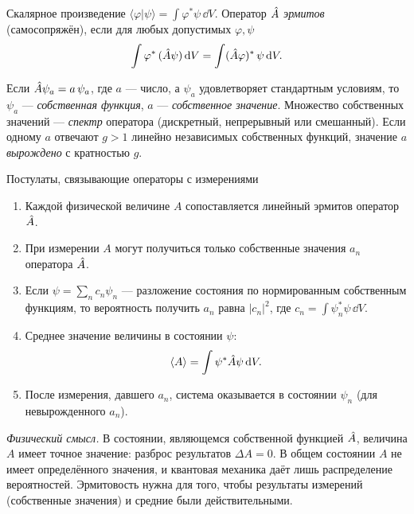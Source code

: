 \begin{definition}
Скалярное произведение $\langle\varphi|\psi\rangle=\int\varphi^*\psi\,\dd V$. Оператор $\hat{A}$
\emph{эрмитов} (самосопряжён), если для любых допустимых $\varphi,\psi$
\begin{equation}\label{eq:5:herm}
  \int\varphi^*\,(\hat{A}\psi)\,\mathrm{d} V=\int(\hat{A}\varphi)^*\,\psi\,\mathrm{d} V .
\end{equation}
\end{definition}

\begin{definition}
Если $\hat{A}\psi_a=a\,\psi_a$, где $a$ — число, а $\psi_a$ удовлетворяет стандартным условиям,
то $\psi_a$ — \emph{собственная функция}, $a$ — \emph{собственное значение}. Множество собственных
значений — \emph{спектр} оператора (дискретный, непрерывный или смешанный). Если одному $a$
отвечают $g>1$ линейно независимых собственных функций, значение $a$ \emph{вырождено} с
кратностью $g$.
\end{definition}

\begin{principle}{Постулаты, связывающие операторы с измерениями}
\begin{enumerate}[leftmargin=1.4em]
 \item Каждой физической величине $A$ сопоставляется линейный эрмитов оператор $\hat{A}$.
 \item При измерении $A$ могут получиться только собственные значения $a_n$ оператора $\hat{A}$.
 \item Если $\psi=\sum_nc_n\psi_n$ — разложение состояния по нормированным собственным функциям,
       то вероятность получить $a_n$ равна $|c_n|^2$, где $c_n=\int\psi_n^*\psi\,\dd V$.
 \item Среднее значение величины в состоянии $\psi$:
       \begin{equation}\label{eq:5:mean}
         \langle A\rangle=\int\psi^*\hat{A}\psi\,\mathrm{d} V .
       \end{equation}
 \item После измерения, давшего $a_n$, система оказывается в состоянии $\psi_n$ (для невырожденного $a_n$).
\end{enumerate}
\end{principle}

\emph{Физический смысл.} В состоянии, являющемся собственной функцией $\hat{A}$, величина $A$ имеет
точное значение: разброс результатов $\Delta A=0$. В общем состоянии $A$ не имеет определённого
значения, и квантовая механика даёт лишь распределение вероятностей. Эрмитовость нужна для
того, чтобы результаты измерений (собственные значения) и средние были действительными.

